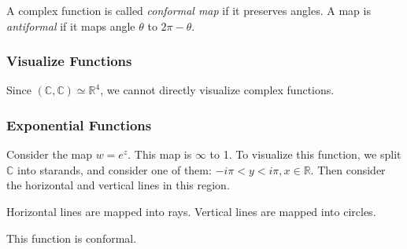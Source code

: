 \begin{definition}[conformality]
	A complex function is called \textit{conformal map} if it preserves angles. A map is  \textit{antiformal} if it maps angle $\theta$ to $2\pi - \theta$.
	
\end{definition}

\subsubsection{Visualize Functions}

Since $(\mathbb{C},\mathbb{C}) \simeq \mathbb{R}^4$, we cannot directly visualize complex functions.

\subsubsection{Exponential Functions}

Consider the map $w = e^z$. This map is  $\infty $ to 1.
To visualize this function, we split $\mathbb{C}$ into starands, and consider one of them: $-i \pi < y < i \pi, x \in \mathbb{R}$. Then consider the horizontal and vertical lines in this region. 

Horizontal lines are mapped into rays. Vertical lines are mapped into circles.

This function is conformal.
